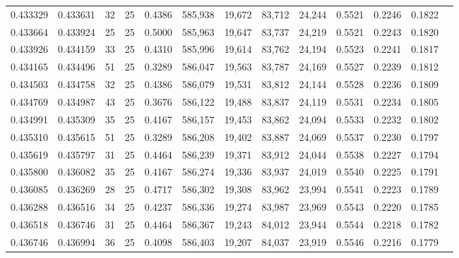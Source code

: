 \begin{tabular}{rrrrrrrrrrrrr}
0.433329 & 0.433631 &    32 &  25 &                                     0.4386 & 585,938 &  19,672 &  83,712 &  24,244 & 0.5521 & 0.2246 & 0.1822 \\
0.433664 & 0.433924 &    25 &  25 &                                     0.5000 & 585,963 &  19,647 &  83,737 &  24,219 & 0.5521 & 0.2243 & 0.1820 \\
0.433926 & 0.434159 &    33 &  25 &                                     0.4310 & 585,996 &  19,614 &  83,762 &  24,194 & 0.5523 & 0.2241 & 0.1817 \\
0.434165 & 0.434496 &    51 &  25 &                                     0.3289 & 586,047 &  19,563 &  83,787 &  24,169 & 0.5527 & 0.2239 & 0.1812 \\
0.434503 & 0.434758 &    32 &  25 &                                     0.4386 & 586,079 &  19,531 &  83,812 &  24,144 & 0.5528 & 0.2236 & 0.1809 \\
0.434769 & 0.434987 &    43 &  25 &                                     0.3676 & 586,122 &  19,488 &  83,837 &  24,119 & 0.5531 & 0.2234 & 0.1805 \\
0.434991 & 0.435309 &    35 &  25 &                                     0.4167 & 586,157 &  19,453 &  83,862 &  24,094 & 0.5533 & 0.2232 & 0.1802 \\
0.435310 & 0.435615 &    51 &  25 &                                     0.3289 & 586,208 &  19,402 &  83,887 &  24,069 & 0.5537 & 0.2230 & 0.1797 \\
0.435619 & 0.435797 &    31 &  25 &                                     0.4464 & 586,239 &  19,371 &  83,912 &  24,044 & 0.5538 & 0.2227 & 0.1794 \\
0.435800 & 0.436082 &    35 &  25 &                                     0.4167 & 586,274 &  19,336 &  83,937 &  24,019 & 0.5540 & 0.2225 & 0.1791 \\
0.436085 & 0.436269 &    28 &  25 &                                     0.4717 & 586,302 &  19,308 &  83,962 &  23,994 & 0.5541 & 0.2223 & 0.1789 \\
0.436288 & 0.436516 &    34 &  25 &                                     0.4237 & 586,336 &  19,274 &  83,987 &  23,969 & 0.5543 & 0.2220 & 0.1785 \\
0.436518 & 0.436746 &    31 &  25 &                                     0.4464 & 586,367 &  19,243 &  84,012 &  23,944 & 0.5544 & 0.2218 & 0.1782 \\
0.436746 & 0.436994 &    36 &  25 &                                     0.4098 & 586,403 &  19,207 &  84,037 &  23,919 & 0.5546 & 0.2216 & 0.1779 \\

\end{tabular}
